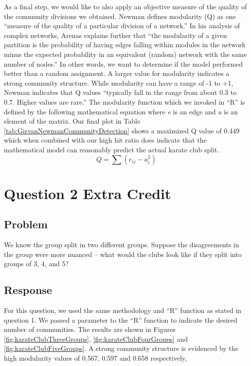 \documentclass[letterpaper,11pt]{report}
\begin{document}
\begin{savenotes}
As a final step, we would like to also apply an objective measure of the quality of the community divisions we obtained.  Newman \cite{newman2004finding} defines modularity (Q) as one ``measure of the quality of a particular division of a network.'' In his analysis of complex networks, Arenas \cite{arenas2008analysis} explains further that ``the modularity of a given partition is the probability of having edges falling within modules in the network minus the expected probability in an equivalent (random) network with the same number of nodes.'' In other words, we want to determine if the model performed better than a random assignment. A larger value for modularity indicates a strong community structure. While modularity can have a range of -1 to +1, Newman \cite{newman2004finding} indicates that Q values ``typically fall in the range from about 0.3 to 0.7.  Higher values are rare.'' The modularity function which we invoked in ``R'' is defined by the following mathematical equation where \emph{e} is an edge and \emph{a} is an element of the matrix. Our final plot in Table \ref{tab:GirvanNewmanCommunityDetection} shows a maximized Q value of 0.449 which when combined with our high hit ratio does indicate that the mathematical model can reasonably predict the actual karate club split.
\begin{equation}
Q = \sum (e_{ij} - a^{2}_{i}) 
\end{equation}

\section{Question 2 Extra Credit}
\subsection{Problem}We know the group split in two different groups.  Suppose the disagreements in the group were more nuanced -- what would the clubs look like if they split into groups of 3, 4, and 5?
\subsection{Response}For this question, we used the same methodology and ``R'' function as stated in question 1. We passed a parameter to the ``R'' function to indicate the desired number of communities.  The results are shown in Figures \ref{fig:karateClubThreeGroups}, \ref{fig:karateClubFourGroups} and \ref{fig:karateClubFiveGroups}. A strong community structure is evidenced by the high modularity values of 0.567, 0.597 and 0.658 respectively,


\end{savenotes}
\end{document}
